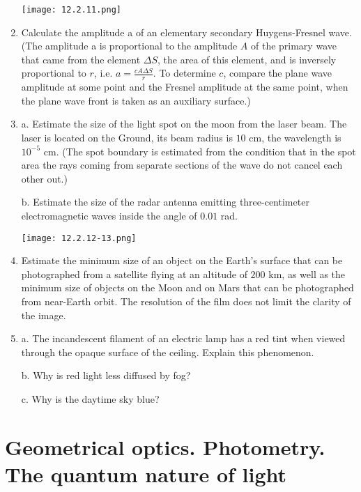 \documentclass{article}
\begin{document}
\begin{enumerate}[label=12.2.\arabic*]
\begin{center}
    \texttt{[image: 12.2.11.png]}
\end{center}


\item Calculate the amplitude a of an elementary secondary Huygens-Fresnel wave. (The amplitude a is proportional to the amplitude $A$ of the primary wave that came from the element $\Delta S$, the area of this element, and is inversely proportional to $r$, i.e. $a = \frac{c A \Delta S}{r}$. To determine $c$, compare the plane wave amplitude at some point and the Fresnel amplitude at the same point, when the plane wave front is taken as an auxiliary surface.)

\item a. Estimate the size of the light spot on the moon from the laser beam. The laser is located on the Ground, its beam radius is $10$ cm, the wavelength is $10^{-5}$ cm. (The spot boundary is estimated from the condition that in the spot area the rays coming from separate sections of the wave do not cancel each other out.) 

b. Estimate the size of the radar antenna emitting three-centimeter electromagnetic waves inside the angle of $0.01$ rad.

\begin{center}
    \texttt{[image: 12.2.12-13.png]}
\end{center}


\item Estimate the minimum size of an object on the Earth's surface that can be photographed from a satellite flying at an altitude of $200$ km, as well as the minimum size of objects on the Moon and on Mars that can be photographed from near-Earth orbit. The resolution of the film does not limit the clarity of the image.

\item a. The incandescent filament of an electric lamp has a red tint when viewed through the opaque surface of the ceiling. Explain this phenomenon.

b. Why is red light less diffused by fog? 

c. Why is the daytime sky blue?




\end{enumerate}
\section{Geometrical optics. Photometry. The quantum nature of light}
\end{document}
